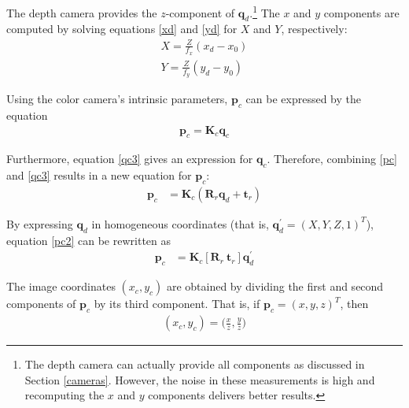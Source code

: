 The depth camera provides the $z$-component of $\mathbf{q}_d$.\footnote{The depth camera can actually 
provide all components as discussed in Section \ref{cameras}. However, the noise in these measurements is 
high and recomputing the $x$ and $y$ components delivers better results.}
The $x$ and $y$ components are computed by solving equations \eqref{xd} and \eqref{yd} for $X$ and 
$Y$, respectively:
\begin{align}
	X = \frac{Z}{f_x} (x_d - x_0) \label{X} \\
	Y = \frac{Z}{f_y} (y_d - y_0) \label{Y}
\end{align}

Using the color camera's intrinsic parameters, $\mathbf{p}_c$ can be expressed by the equation
\begin{align}
	\mathbf{p}_c = \mathbf{K}_c \mathbf{q}_c \label{pc}
\end{align}

Furthermore, equation \eqref{qc3} gives an expression for $\mathbf{q}_c$. Therefore, combining 
\eqref{pc} and \eqref{qc3} results in a new equation for $\mathbf{p}_c$:
\begin{align}
	\mathbf{p}_c &=  \mathbf{K}_c (\mathbf{R}_r \mathbf{q}_{d}  + \mathbf{t}_r) \label{pc2}
\end{align}

By expressing $\mathbf{q}_{d}$ in homogeneous coordinates (that is, $\mathbf{q}_{d}^{'} = (X, Y, Z, 1)^T$), 
equation \eqref{pc2} can be rewritten as 
\begin{align}
	\mathbf{p}_c &=  \mathbf{K}_c [\mathbf{R}_r  ~  \mathbf{t}_r] \mathbf{q}_{d}^{'} \label{pc3}
\end{align}

The image coordinates $(x_c, y_c)$ are obtained by dividing the first and second components of 
$\mathbf{p}_c$ by its third component. That is, if $\mathbf{p}_c = (x,y,z)^T$, then 
\begin{align}
	(x_c, y_c) = \Bigg( \frac{x}{z} , \frac{y}{z} \Bigg) \label{xcyc}
\end{align}


